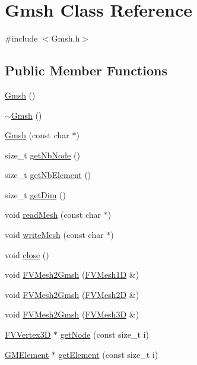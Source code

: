 \hypertarget{classGmsh}{
\section{Gmsh Class Reference}
\label{da/d5d/classGmsh}
}


{\ttfamily \#include $<$Gmsh.h$>$}

\subsection*{Public Member Functions}
\begin{DoxyCompactItemize}
\item 
\hyperlink{classGmsh_ad2da23d7e35b9fc76f58743cc549a22f}{Gmsh} ()
\item 
\hyperlink{classGmsh_a175d9c6b456585002d1d61649dcf732d}{$\sim$Gmsh} ()
\item 
\hyperlink{classGmsh_a82bfb712b8a045ca0511bb0d03bf55f6}{Gmsh} (const char $\ast$)
\item 
size\_\-t \hyperlink{classGmsh_a57250e339214b20036c3519ccee1e559}{getNbNode} ()
\item 
size\_\-t \hyperlink{classGmsh_ac6f522399e1d4bf255253de3c6e0063f}{getNbElement} ()
\item 
size\_\-t \hyperlink{classGmsh_a890ccac161f0becd266252b4cd3b9584}{getDim} ()
\item 
void \hyperlink{classGmsh_aa0f64160e12b798d9e199b44efaa5981}{readMesh} (const char $\ast$)
\item 
void \hyperlink{classGmsh_abe80c38932f08b4c551980dab40b6de3}{writeMesh} (const char $\ast$)
\item 
void \hyperlink{classGmsh_a5ae591df94fc66ccb85cbb6565368bca}{close} ()
\item 
void \hyperlink{classGmsh_a387ef615b882b4cc4bc304030ede5991}{FVMesh2Gmsh} (\hyperlink{classFVMesh1D}{FVMesh1D} \&)
\item 
void \hyperlink{classGmsh_a404e3317b60cbe65ac7ca20cd5bb0dcb}{FVMesh2Gmsh} (\hyperlink{classFVMesh2D}{FVMesh2D} \&)
\item 
void \hyperlink{classGmsh_adc58fe3881b7ac8ad547c7f3993039c0}{FVMesh2Gmsh} (\hyperlink{classFVMesh3D}{FVMesh3D} \&)
\item 
\hyperlink{classFVVertex3D}{FVVertex3D} $\ast$ \hyperlink{classGmsh_afc5e0f58e35a293293d3ad54990b8f39}{getNode} (const size\_\-t i)
\item 
\hyperlink{classGMElement}{GMElement} $\ast$ \hyperlink{classGmsh_a1be870d8aeb5e81879d8c5fcee057815}{getElement} (const size\_\-t i)

\end{DoxyCompactItemize}
